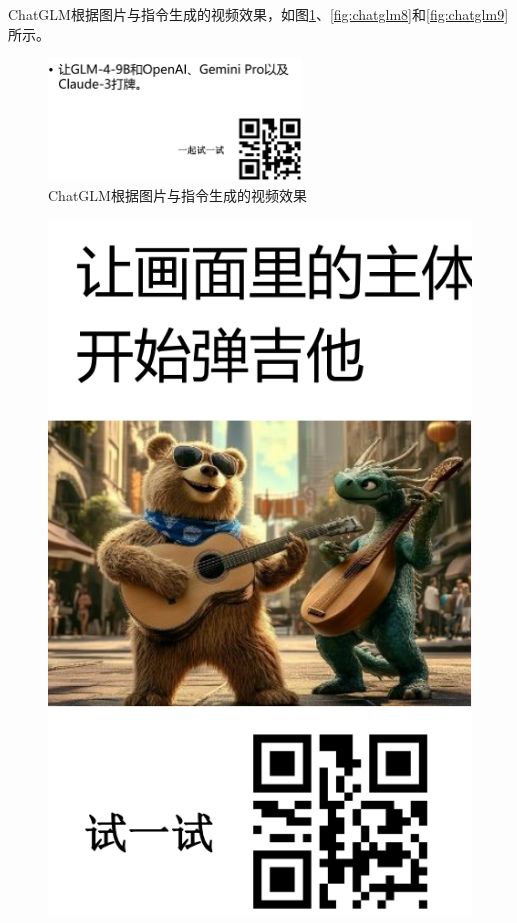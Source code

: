 ChatGLM根据图片与指令生成的视频效果，如图\ref{fig:chatglm7}、\ref{fig:chatglm8}和\ref{fig:chatglm9}所示。

\begin{figure}[H]
	\centering
	\includegraphics[width=0.6\textwidth]{figures/chapter1/fig9.png}
	\caption{ChatGLM根据图片与指令生成的视频效果}
	\label{fig:chatglm7}
\end{figure}

\begin{figure}[H]
    \centering
    \begin{minipage}[t]{0.35\textwidth}
        \centering
        \includegraphics[width=\textwidth]{figures/chapter1/fig10.1.png}

\end{minipage}
\end{figure}
